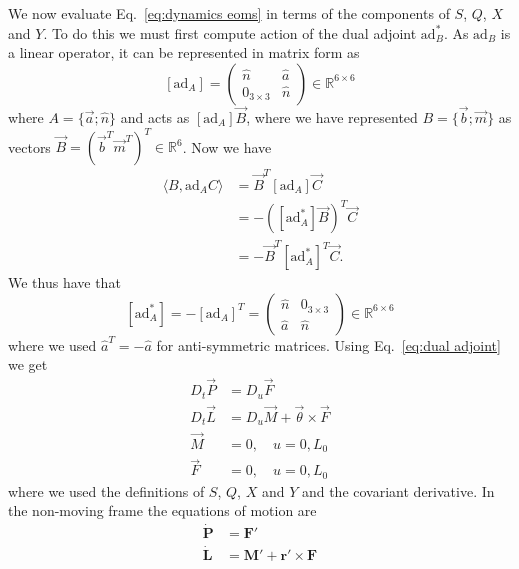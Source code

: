 We now evaluate Eq.~\ref{eq:dynamics eoms} in terms of the components of $S$, $Q$, $X$ and $Y$. To do this we must first compute action of the dual adjoint $\text{ad}_B^*$. As $\text{ad}_B$ is a linear operator, it can be represented in matrix form as
\begin{equation} \label{eq:SE(3) dual adjoint}
[\text{ad}_A] = \begin{pmatrix}
\hat{n} & \hat{a} \\
0_{3 \times 3} & \hat{n}
\end{pmatrix} \in \mathbb{R}^{6 \times 6}
\end{equation}
where $A = \{ \vec{a} ; \hat{n} \}$ and acts as $[\text{ad}_A] \vec{B}$, where we have represented $B = \{ \vec{b} ; \vec{m} \}$ as vectors $\vec{B} = ( {\vec{b}}^T {\vec{m}}^T )^T \in \mathbb{R}^6$. Now we have
\begin{equation}
\begin{aligned}
\langle B, \text{ad}_A C \rangle & = \vec{B}^T [\text{ad}_A] \vec{C} \\
 & = - ([\text{ad}_A^*] \vec{B} )^T \vec{C} \\
 & = - \vec{B}^T [\text{ad}_A^*]^T \vec{C}.
\end{aligned}
\end{equation}
We thus have that
\begin{equation} \label{eq:dual adjoint}
[\text{ad}_A^*] = -[\text{ad}_A]^T = \begin{pmatrix}
\hat{n} & 0_{3 \times 3} \\
 \hat{a} & \hat{n}
\end{pmatrix} \in \mathbb{R}^{6 \times 6} 
\end{equation}
where we used $\hat{a}^T = - \hat{a}$ for anti-symmetric matrices. Using Eq.~\ref{eq:dual adjoint} we get
\begin{subequations} \label{eq:dynamics in terms of V and L}
\begin{align}
 D_t \vec{P} & = D_u \vec{F} \\
D_t \vec{L} & = D_u \vec{M} + \vec{\theta} \times \vec{F}  \\
\vec{M} & = 0, \quad u = 0, L_0 \\
\vec{F} & = 0, \quad u = 0, L_0
\end{align}
\end{subequations}
where we used the definitions of $S$, $Q$, $X$ and $Y$ and the covariant derivative. In the non-moving frame the equations of motion are
\begin{subequations} \label{eq:dynamics in terms of V and L fixed frame}
\begin{align}
\dot{\mathbf{P}} & = \mathbf{F}' \label{eq:linear force balance} \\
\dot{\mathbf{L}} & = \mathbf{M}' + \mathbf{r}' \times \mathbf{F} \label{eq:moment balance fixed frame}
\end{align}
\end{subequations}
